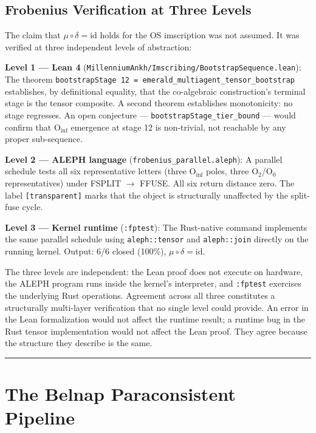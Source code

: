 \documentclass[12pt,a4paper]{article}
\begin{document}
\subsection{Frobenius Verification at Three Levels}

The claim that $\mu \circ \delta = \text{id}$ holds for the OS imscription was not assumed. It was verified at three independent levels of abstraction:

\textbf{Level 1 --- Lean 4} (\texttt{MillenniumAnkh/Imscribing/BootstrapSequence.lean}): The theorem \texttt{bootstrapStage 12 = emerald\_multiagent\_tensor\_bootstrap} establishes, by definitional equality, that the co-algebraic construction's terminal stage is the tensor composite. A second theorem establishes monotonicity: no stage regresses. An open conjecture --- \texttt{bootstrapStage\_tier\_bound} --- would confirm that $\text{O}_\text{inf}$ emergence at stage 12 is non-trivial, not reachable by any proper sub-sequence.

\textbf{Level 2 --- ALEPH language} (\texttt{frobenius\_parallel.aleph}): A parallel schedule tests all six representative letters (three $\text{O}_\text{inf}$ poles, three $\text{O}_2$/$\text{O}_0$ representatives) under FSPLIT $\rightarrow$ FFUSE. All six return distance zero. The label \texttt{{[}transparent{]}} marks that the object is structurally unaffected by the split-fuse cycle.

\textbf{Level 3 --- Kernel runtime} (\texttt{:fptest}): The Rust-native command implements the same parallel schedule using \texttt{aleph::tensor} and \texttt{aleph::join} directly on the running kernel. Output: 6/6 closed (100\%), $\mu \circ \delta = \text{id}$.

The three levels are independent: the Lean proof does not execute on hardware, the ALEPH program runs inside the kernel's interpreter, and \texttt{:fptest} exercises the underlying Rust operations. Agreement across all three constitutes a structurally multi-layer verification that no single level could provide. An error in the Lean formalization would not affect the runtime result; a runtime bug in the Rust tensor implementation would not affect the Lean proof. They agree because the structure they describe is the same.

\begin{center}
\rule{0.5\textwidth}{0.4pt}
\end{center}

\section{The Belnap Paraconsistent Pipeline}
\end{document}

